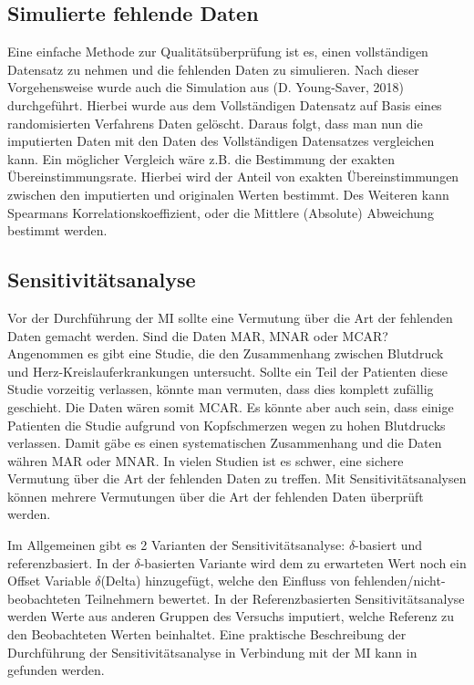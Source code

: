 \subsection{Simulierte fehlende Daten}

Eine einfache Methode zur Qualitätsüberprüfung ist es, einen vollständigen Datensatz zu nehmen und die fehlenden Daten zu 
simulieren. Nach dieser Vorgehensweise wurde auch die Simulation aus (D. Young-Saver, 2018) durchgeführt. Hierbei wurde 
aus dem Vollständigen Datensatz auf Basis eines randomisierten Verfahrens Daten gelöscht. Daraus folgt, dass man nun die 
imputierten Daten mit den Daten des Vollständigen Datensatzes vergleichen kann. Ein möglicher Vergleich wäre z.B. die 
Bestimmung der exakten Übereinstimmungsrate. Hierbei wird der Anteil von exakten Übereinstimmungen zwischen den imputierten 
und originalen Werten bestimmt. Des Weiteren kann Spearmans Korrelationskoeffizient, oder die Mittlere (Absolute) Abweichung 
bestimmt werden. \autocite[3664]{Young-Saver2018} 

\subsection{Sensitivitätsanalyse}

Vor der Durchführung der MI sollte eine Vermutung über die Art der fehlenden Daten gemacht werden. Sind die Daten MAR, MNAR 
oder MCAR? Angenommen es gibt eine Studie, die den Zusammenhang zwischen Blutdruck und Herz-Kreislauferkrankungen untersucht. 
Sollte ein Teil der Patienten diese Studie vorzeitig verlassen, könnte man vermuten, dass dies komplett zufällig geschieht. 
Die Daten wären somit MCAR. Es könnte aber auch sein, dass einige Patienten die Studie aufgrund von Kopfschmerzen wegen zu 
hohen Blutdrucks verlassen. Damit gäbe es einen systematischen Zusammenhang und die Daten währen MAR oder MNAR. In vielen 
Studien ist es schwer, eine sichere Vermutung über die Art der fehlenden Daten zu treffen. Mit Sensitivitätsanalysen können 
mehrere Vermutungen über die Art der fehlenden Daten überprüft werden. \autocite[2815]{Cro2020}

Im Allgemeinen gibt es 2 Varianten der Sensitivitätsanalyse: $\delta$-basiert und referenzbasiert. In der $\delta$-basierten Variante 
wird dem zu erwarteten Wert noch ein Offset Variable $\delta$(Delta) hinzugefügt, welche den Einfluss von 
fehlenden/nicht-beobachteten Teilnehmern bewertet.  In der Referenzbasierten Sensitivitätsanalyse werden Werte aus 
anderen Gruppen des Versuchs imputiert, welche Referenz zu den Beobachteten Werten beinhaltet. \autocite[2815]{Cro2020} 
Eine praktische Beschreibung der Durchführung der Sensitivitätsanalyse in Verbindung mit der MI kann in 
\textcite[]{Cro2020} gefunden werden.

